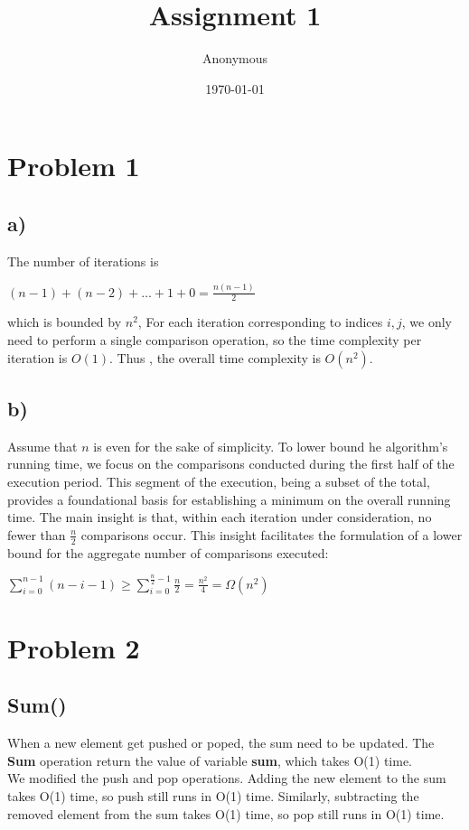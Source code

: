 \documentclass[12pt]{article}
\title{Assignment 1}
\author{Anonymous}
\date{\today}
\begin{document}
\maketitle

\section*{Problem 1}
\subsection*{a)}
The number of iterations is 
\begin{center}
    $(n-1) + (n-2) + \dots + 1 + 0= \frac{n(n-1)}{2}$
\end{center}
which is bounded by $n^2$, For each iteration corresponding to 
indices $i,j$, we only need to perform a single comparison operation, 
so the time complexity per iteration is $O(1)$.
Thus , the overall time complexity is $O(n^2)$.

\subsection*{b)}
Assume that \(n\) is even for the sake of simplicity. To lower bound he algorithm's running time, we focus on the comparisons conducted during the first half of the execution period. This segment of the execution, being a subset of the total, provides a foundational basis for establishing a minimum on the overall running time. The main insight is that, within each iteration under consideration, no fewer than \(\frac{n}{2}\) comparisons occur. This insight facilitates the formulation of a lower bound for the aggregate number of comparisons executed:
\begin{center}
    $\sum_{i=0}^{n-1} (n-i-1) \geq \sum_{i=0}^{\frac{n}{2} - 1} \frac{n}{2}
    = \frac{n^2}{4} = \Omega{(n^2)}$
\end{center}

\newpage

\section*{Problem 2}

\subsection*{Sum()}

When a new element get pushed or poped, the sum need to be updated.
The \textbf{Sum} operation return the value of variable \textbf{sum},
which takes O(1) time.\\
We modified the push and pop operations. 
Adding the new element to the sum takes O(1) time, so push still runs 
in O(1) time. Similarly, subtracting the removed element from the 
sum takes O(1) time, so pop still runs in O(1) time.
\end{document}
